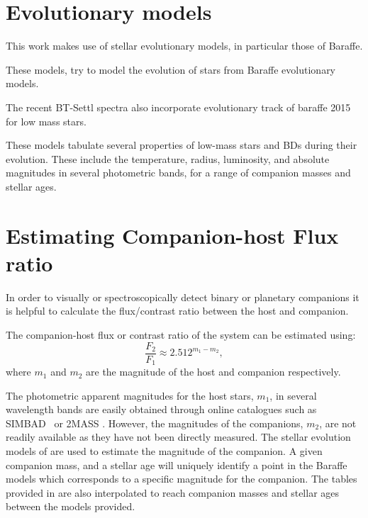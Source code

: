 

\section{Evolutionary models}

This work makes use of stellar evolutionary models, in particular those of Baraffe.

These models, try to model the evolution of stars from
Baraffe evolutionary models.


The recent {BT-Settl} spectra also incorporate evolutionary track of baraffe 2015 for low mass stars.

These models tabulate several properties of low-mass stars and BDs during their evolution.
These include the temperature, radius, luminosity, and absolute magnitudes in several photometric bands, for a range of companion masses and stellar ages.



\section{Estimating Companion-host Flux ratio}
\label{sec:compaion_flux_ratio}
In order to visually or spectroscopically detect binary or planetary companions it is helpful to calculate the flux/contrast ratio between the host and companion.

The companion-host flux or contrast ratio of the system can be estimated using:
\begin{equation}
\frac{F_{2}}{F_{1}} \approx 2.512^{m_{1} - m_{2}}, \label{eqn:mag_flux_ratios}
\end{equation}
where \(m_{1}\) and \(m_{2}\) are the magnitude of the host and companion respectively.

The photometric apparent magnitudes for the host stars, \(m_{1}\), in several wavelength bands are easily obtained through online catalogues such as {SIMBAD}~\citep{wenger_simbad_2000} or {2MASS} \citep{skrutskie_two_2006}.
However, the magnitudes of the companions, \(m_{2}\), are not readily available as they have not been directly measured.
The stellar evolution models of \citet{baraffe_evolutionary_2003, baraffe_new_2015} are used to estimate the magnitude of the companion.
A given companion mass, and a stellar age will uniquely identify a point in the Baraffe models which corresponds to a specific magnitude for the companion.
The tables provided in \citet{baraffe_evolutionary_2003, baraffe_new_2015} are also interpolated to reach companion masses and stellar ages between the models provided.


